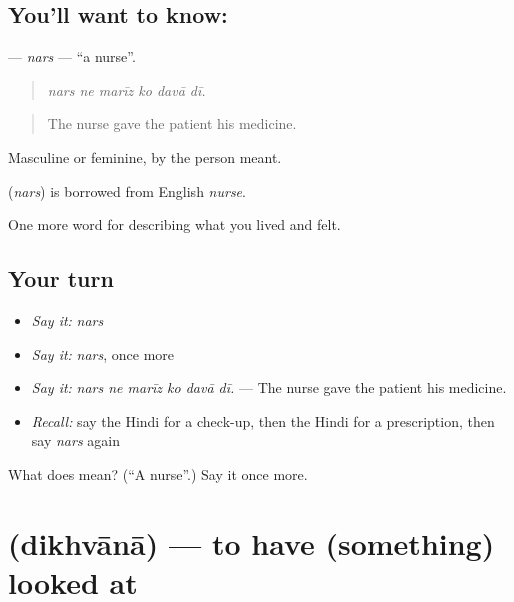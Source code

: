 \subsection*{You'll want to know: }
\textbf{} — \emph{nars} — \textquotedblleft{}a nurse\textquotedblright{}.

\begin{quote}
     
\end{quote}

\begin{quote}
\emph{nars ne marīz ko davā dī.}
\end{quote}

\begin{quote}
The nurse gave the patient his medicine.
\end{quote}

Masculine or feminine, by the person meant.

\begin{cousinweb}
\textbf{} (\emph{nars}) is borrowed from English \emph{nurse}.
\end{cousinweb}

\begin{grammarlens}[title={What you've built}]
One more word for describing what you lived and felt.
\end{grammarlens}

\subsection*{Your turn}
\begin{itemize}
\raggedright
  \item \emph{Say it:} \emph{nars}
  \item \emph{Say it:} \emph{nars}, once more
  \item \emph{Say it:} \emph{nars ne marīz ko davā dī.} — The nurse gave the patient his medicine.
  \item \emph{Recall:} say the Hindi for a check-up, then the Hindi for a prescription, then say \emph{nars} again
\end{itemize}

\begin{tcolorbox}[breakable,colback=teal!4,colframe=teal!35!black,title={Before you move on}]
What does  mean? (\textquotedblleft{}A nurse\textquotedblright{}.) Say it once more.
\end{tcolorbox}
\section[\texorpdfstring{\hi{दिखवाना} (dikhvānā)}{दिखवाना (dikhvānā)}]{ (dikhvānā) — to have (something) looked at}

